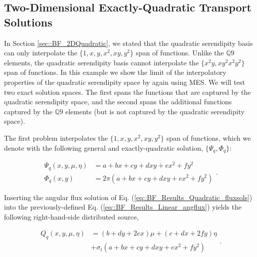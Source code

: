 \subsection{Two-Dimensional Exactly-Quadratic Transport Solutions}
\label{sec::BF_Results_Quadratic}

In Section \ref{sec::BF_2DQuadratic}, we stated that the quadratic serendipity basis can only interpolate the $\{ 1, x, y, x^2, xy, y^2 \}$ span of functions. Unlike the $\mathbb{Q}9$ elements, the quadratic serendipity basis cannot interpolate the $\{ x^2y, x y^2 x^2 y^2 \}$ span of functions. In this example we show the limit of the interpolatory properties of the quadratic serendipity space by again using MES. We will test two exact solution spaces. The first spans the functions that are captured by the quadratic serendipity space, and the second spans the additional functions captured by the $\mathbb{Q}9$ elements (but is not captured by the quadratic serendipity space).

The first problem interpolates the $\{ 1, x, y, x^2, xy, y^2 \}$ span of functions, which we denote with the following general and exactly-quadratic solution, $\{\Psi_q, \Phi_q\}$:

\begin{equation}
\label{eq::BF_Results_Quadratic_fluxsols}
\begin{aligned}
\Psi_q (x,y,\mu,\eta) &= a + bx + c y+ d xy + e x^2 + fy^2 \\
\Phi_q (x,y) &= 2 \pi \left(  a + bx + c y+ d xy + e x^2 + fy^2 \right)
\end{aligned} .
\end{equation}

\noindent Inserting the angular flux solution of Eq. (\ref{eq::BF_Results_Quadratic_fluxsols}) into the previously-defined Eq. (\ref{eq::BF_Results_Linear_angflux}) yields the following right-hand-side distributed source,

\begin{equation}
\label{eq::BF_Results_Quadratic_rhs}
\begin{aligned}
Q_q (x,y,\mu,\eta) &=  \left( b+d y+2 e x \right) \mu + \left( c+d x+2 f y \right) \eta \\
&+ \sigma_t \left( a + bx + c y+ d xy + e x^2 + fy^2 \right)
\end{aligned} .
\end{equation}

